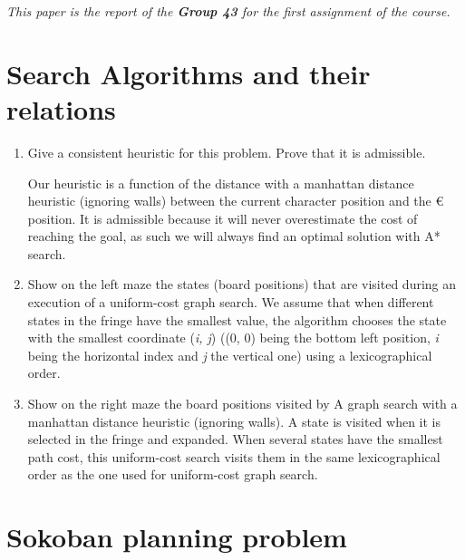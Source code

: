 \bigskip
\textit{This paper is the report of the \textbf{Group 43} for the first assignment
of the course.}

\section{Search Algorithms and their relations}

\begin{enumerate}
 \item Give a consistent heuristic for this problem. Prove that it is admissible.
    \begin{framed}
        Our heuristic is a function of the distance with a manhattan
        distance heuristic (ignoring walls) between
        the current character position and the \euro{} position. It is
        admissible because it will never overestimate the cost of reaching
        the goal, as such we will always find an optimal solution with A*
        search. 
    \end{framed}
 \item Show on the left maze the states (board positions) that are visited during an
execution of a uniform-cost graph search. We assume that when different states
in the fringe have the smallest value, the algorithm chooses the state with
the smallest coordinate (\textit{i, j}) ((0, 0) being the bottom left position, \textit{i} being the
horizontal index and \textit{j} the vertical one) using a lexicographical order.
    \begin{framed}
    \end{framed}
  \item Show on the right maze the board positions visited by A graph search with
a manhattan distance heuristic (ignoring walls). A state is visited when it is
selected in the fringe and expanded. When several states have the smallest
path cost, this uniform-cost search visits them in the same lexicographical order
as the one used for uniform-cost graph search.
    \begin{framed}
    \end{framed}

\end{enumerate}

\section{Sokoban planning problem}

